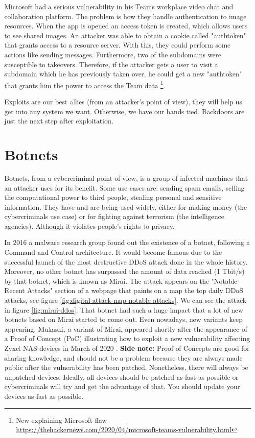 \documentclass[11pt, a4paper,twoside]{tesi_upf}
\begin{document}
Microsoft had a serious vulnerability in his Teams workplace video chat and collaboration platform. The problem is how they handle authentication to image resources. When the app is opened an access token is created, which allows users to see shared images. An attacker was able to obtain a cookie called "authtoken" that grants access to a resource server. With this, they could perform some actions like sending messages. Furthermore, two of the subdomains were susceptible to takeovers. Therefore, if the attacker gets a user to visit a subdomain which he has previously taken over, he could get a new "authtoken" that grants him the power to access the Team data \footnote{New explaining Microsoft flaw \url{https://thehackernews.com/2020/04/microsoft-teams-vulnerability.html}}.

Exploits are our best allies (from an attacker's point of view), they will help us get into any system we want. Otherwise, we have our hands tied. Backdoors are just the next step after exploitation.

\section{Botnets}

Botnets, from a cybercriminal point of view, is a group of infected machines that an attacker uses for its benefit. Some use cases are: sending spam emails, selling the computational power to third people, stealing personal and sensitive information. They have and are being used widely, either for making money (the cybercriminals use case) or for fighting against terrorism (the intelligence agencies). Although it violates people's rights to privacy.

In 2016 a malware research group found out the existence of a botnet, following a Command and Control architecture. It would become famous due to the successful launch of the most destructive DDoS attack done in the whole history. Moreover, no other botnet has surpassed the amount of data reached (1 Tbit/s) by that botnet, which is known as Mirai. The attack appears on the "Notable Recent Attacks" section of a webpage that paints on a map the top daily DDoS attacks, see figure \ref{fig:digital-attack-map-notable-attacks}. We can see the attack in figure \ref{fig:mirai-ddos}. That botnet had such a huge impact that a lot of new botnets based on Mirai started to come out. Even nowadays, new variants keep appearing. Mukashi, a variant of Mirai, appeared shortly after the appearance of a Proof of Concept (PoC) illustrating how to exploit a new vulnerability affecting Zyxel NAS devices in March of 2020 \cite{palo-alto}. \textbf{Side note:} Proof of Concepts are good for sharing knowledge, and should not be a problem because they are always made public after the vulnerability has been patched. Nonetheless, there will always be unpatched devices. Ideally, all devices should be patched as fast as possible or cybercriminals will try and get the advantage of that. You should update your devices as fast as possible.
\end{document}

